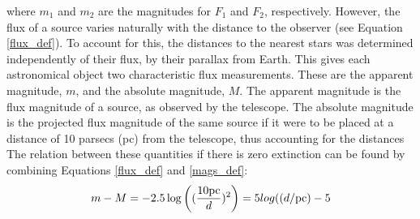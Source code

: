 \documentclass[12pt, a4paper]{report}
\begin{document}
where $m_{1}$ and $m_{2}$ are the magnitudes for $F_{1}$ and $F_{2}$, respectively. However, the flux of a source varies naturally with the distance to the observer (see Equation \ref{flux_def}). To account for this, the distances to the nearest stars was determined independently of their flux, by their parallax from Earth. This gives each astronomical object two characteristic flux measurements. These are the apparent magnitude, $m$, and the absolute magnitude, $M$. The apparent magnitude is the flux magnitude of a source, as observed by the telescope. The absolute magnitude is the projected flux magnitude of the same source if it were to be placed at a distance of 10 parsecs (pc) from the telescope, thus accounting for the distances The relation between these quantities if there is zero extinction can be found by combining Equations \ref{flux_def} and \ref{mags_def}:
\begin{equation}
\label{distance_modulus}
m - M = -2.5\log \left( (\frac{10\textnormal{pc}}{d})^{2} \right) = 5log( (d/\textnormal{pc}) - 5
\end{equation}
\end{document}
